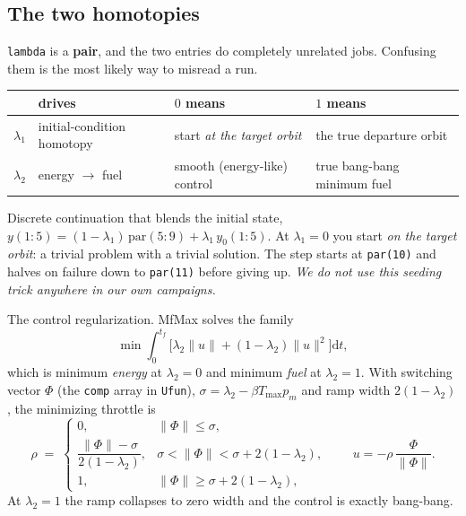\documentclass[11pt]{article}
\newcommand{\code}[1]{\texttt{\small #1}}
\newcommand{\Tmax}{T_{\max}}
\begin{document}
\subsection{The two homotopies}\label{sec:homotopy}

\code{lambda} is a \textbf{pair}, and the two entries do completely unrelated
jobs. Confusing them is the most likely way to misread a run.

\begin{center}
\begin{tabular}{@{}llll@{}}
\toprule
 & drives & $0$ means & $1$ means\\
\midrule
$\lambda_1$ & initial-condition homotopy & start \emph{at the target orbit} &
the true departure orbit\\
$\lambda_2$ & energy $\to$ fuel & smooth (energy-like) control &
true bang-bang minimum fuel\\
\bottomrule
\end{tabular}
\end{center}

\begin{description}[leftmargin=1.4em]
\item[$\lambda_1$, run by \code{homCI}.] Discrete continuation that blends the
  initial state, $y(1{:}5) = (1-\lambda_1)\,\mathrm{par}(5{:}9) +
  \lambda_1\,y_0(1{:}5)$. At $\lambda_1 = 0$ you start \emph{on the target
  orbit}: a trivial problem with a trivial solution. The step starts at
  \code{par(10)} and halves on failure down to \code{par(11)} before giving
  up. \emph{We do not use this seeding trick anywhere in our own campaigns.}
\item[$\lambda_2$, run by \code{Fullpath}.] The control regularization. MfMax
  solves the family
  \begin{equation}
  \min \int_0^{t_f}\!\Big[\lambda_2\|u\| + (1-\lambda_2)\|u\|^2\Big]
  \mathrm{d}t,
  \end{equation}
  which is minimum \emph{energy} at $\lambda_2 = 0$ and minimum \emph{fuel} at
  $\lambda_2 = 1$. With switching vector $\Phi$ (the \code{comp} array in
  \code{Ufun}), $\sigma = \lambda_2 - \beta\Tmax p_m$ and ramp width
  $2(1-\lambda_2)$, the minimizing throttle is
  \begin{equation}
  \rho \;=\;
  \begin{cases}
  0, & \|\Phi\| \le \sigma,\\[2pt]
  \dfrac{\|\Phi\| - \sigma}{2(1-\lambda_2)}, &
  \sigma < \|\Phi\| < \sigma + 2(1-\lambda_2),\\[6pt]
  1, & \|\Phi\| \ge \sigma + 2(1-\lambda_2),
  \end{cases}
  \qquad u = -\rho\,\frac{\Phi}{\|\Phi\|}.
  \end{equation}
  At $\lambda_2 = 1$ the ramp collapses to zero width and the control is
  exactly bang-bang.
\end{description}
\end{document}
